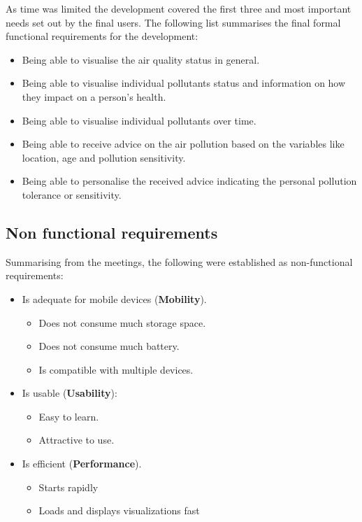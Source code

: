 As time was limited the development covered the first three and most important needs set out by the final users. The following list summarises the final formal functional requirements for the development:

\begin{itemize}
    \item Being able to visualise the air quality status in general.
    \item Being able to visualise individual pollutants status and information on how they impact on a person's health.
    \item Being able to visualise individual pollutants over time.
    \item Being able to receive advice on the air pollution based on the variables like location, age and pollution sensitivity. 
    \item Being able to personalise the received advice indicating the personal pollution tolerance or sensitivity.
\end{itemize}

\subsection{Non functional requirements}

Summarising from the meetings, the following were established as non-functional requirements:

\begin{itemize}
    \item Is adequate for mobile devices (\textbf{Mobility}).
    \begin{itemize}
        \item Does not consume much storage space.
        \item Does not consume much battery.
        \item Is compatible with multiple devices.
    \end{itemize}
    \item Is usable (\textbf{Usability}):
    \begin{itemize}
        \item Easy to learn.
        \item Attractive to use.
    \end{itemize}
    \item Is efficient (\textbf{Performance}).
    \begin{itemize}
        \item Starts rapidly
        \item Loads and displays visualizations fast
    \end{itemize}
\end{itemize}


